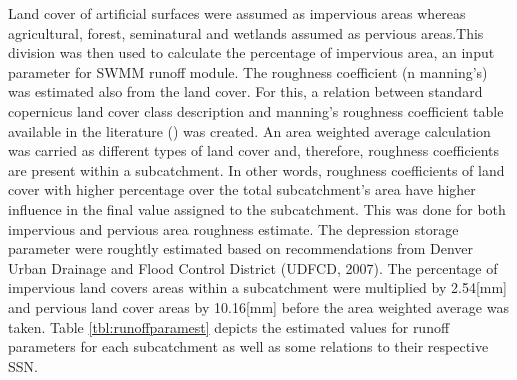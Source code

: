 Land cover of artificial surfaces were assumed as impervious areas whereas agricultural, forest, seminatural and wetlands assumed as pervious areas.This division was then used to calculate the percentage of impervious area, an input parameter for SWMM runoff module. The roughness coefficient (n manning's) was estimated also from the land cover. For this, a relation between standard copernicus land cover class description and manning's roughness coefficient table available in the literature (\cite{Rossman2016}) was created. An area weighted average calculation was carried as different types of land cover and, therefore, roughness coefficients are present within a subcatchment. In other words, roughness coefficients of land cover with higher percentage over the total subcatchment's area have higher influence in the final value assigned to the subcatchment. This was done for both impervious and pervious area roughness estimate. 
The depression storage parameter were roughtly estimated based on recommendations from Denver Urban Drainage and Flood Control District (UDFCD, 2007). The percentage of impervious land covers areas within a subcatchment were multiplied by 2.54[mm] and pervious land cover areas by 10.16[mm] before the area weighted average was taken. Table \ref{tbl:runoffparamest} depicts the estimated values for runoff parameters for each subcatchment as well as some relations to their respective \ac{SSN}.
    
